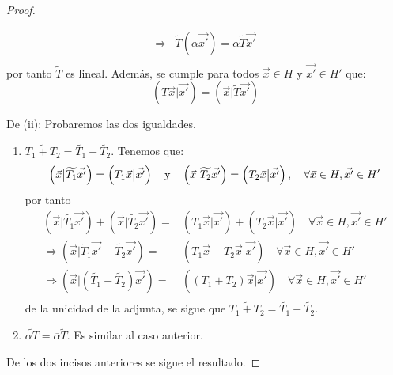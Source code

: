 \documentclass[12pt]{report}
\theoremstyle{largebreak}
\newcommand\adj[1]{\ensuremath{\widetilde{#1}}}
\newcommand\pint[2]{\ensuremath{\left(#1\big|#2\right)}}
\newcommand\conj[1]{\ensuremath{\overline{#1}}}
\begin{document}
\begin{proof}
\begin{itemize}
\begin{equation*}
\begin{split}
                    \Rightarrow&\adj{T}(\alpha\vec{x'})=\alpha\adj{T}\vec{x'}\\
                \end{split}
            \end{equation*}
            por tanto $\adj{T}$ es lineal. Además, se cumple para todos $\vec{x}\in H$ y $\vec{x'}\in H'$ que:
            \begin{equation*}
                \pint{T\vec{x}}{\vec{x'}}=\pint{\vec{x}}{\adj{T} \vec{x'}}
            \end{equation*}
        \end{itemize}

        De (ii): Probaremos las dos igualdades.
        \begin{enumerate}
            \item $\adj{T_1+T_2}=\adj{T_1}+\adj{T_2}$. Tenemos que:
            \begin{equation*}
                \pint{\vec{x}}{\adj{T_1}\vec{x'}}=\pint{T_1\vec{x}}{\vec{x'}}\quad\textup{y}\quad\pint{\vec{x}}{\adj{T_2}\vec{x'}}=\pint{T_2\vec{x}}{\vec{x'}},\quad\forall\vec{x}\in H,\vec{x'}\in H'
            \end{equation*}
            por tanto
            \begin{equation*}
                \begin{split}
                    \pint{\vec{x}}{\adj{T_1}\vec{x'}}+\pint{\vec{x}}{\adj{T_2}\vec{x'}}=&\pint{T_1\vec{x}}{\vec{x'}}+\pint{T_2\vec{x}}{\vec{x'}}\quad\forall\vec{x}\in H,\vec{x'}\in H'\\
                    \Rightarrow\pint{\vec{x}}{\adj{T_1}\vec{x'}+\adj{T_2}\vec{x'}}=&\pint{T_1\vec{x}+T_2\vec{x}}{\vec{x'}}\quad\forall\vec{x}\in H,\vec{x'}\in H'\\
                    \Rightarrow \pint{\vec{x}}{(\adj{T_1}+\adj{T_2})\vec{x'}}=&\pint{(T_1+T_2)\vec{x}}{\vec{x'}}\quad\forall\vec{x}\in H,\vec{x'}\in H'\\
                \end{split}
            \end{equation*}
            de la unicidad de la adjunta, se sigue que $\adj{T_1+T_2}=\adj{T_1}+\adj{T_2}$.
            \item $\adj{\alpha T}=\conj{\alpha}\adj{T}$. Es similar al caso anterior.
        \end{enumerate}
        De los dos incisos anteriores se sigue el resultado.


\end{proof}
\end{document}
